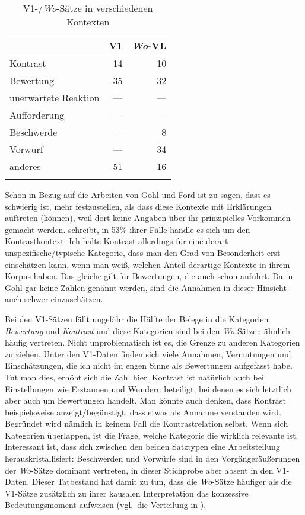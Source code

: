 \begin{table}
	\caption{\label{tab:1044}V1-/\textit{Wo}-Sätze in verschiedenen Kontexten}
    \begin{tabular}[t]{lrr}
    \lsptoprule
	& V1 & \textit{Wo}-VL\\\midrule
	Kontrast & 14 & 10\\
	Bewertung & 35 & 32\\
	unerwartete Reaktion & --- & ---\\
	Aufforderung & --- & ---\\
	Beschwerde & --- & 8\\
	Vorwurf & --- & 34\\
	anderes & 51 & 16\\
	\lspbottomrule	
    \end{tabular}   
\end{table}
Schon in Bezug auf die Arbeiten von Gohl und Ford ist zu sagen, dass es schwierig ist, mehr festzustellen, als dass diese Kontexte mit Erklärungen  auftreten (können), weil dort keine Angaben über ihr prinzipielles Vorkommen gemacht werden. \citet[548]{Ford1993} schreibt, in 53\% ihrer Fälle handle es sich um den Kontrastkontext. Ich halte Kontrast  allerdings für eine derart unspezifische/typische Kategorie, dass man den Grad von Besonderheit erst einschätzen kann, wenn man weiß, welchen Anteil derartige Kontexte in ihrem Korpus haben. Das glei\-che gilt für Bewertungen, die \citet{Ford1993} auch schon anführt. Da in Gohl gar keine Zahlen genannt werden, sind die Annahmen in dieser Hinsicht auch schwer einzuschätzen. 

Bei den V1-Sätzen fällt ungefähr die Hälfte der Belege in die Kategorien \textit{Be\-wertung} und \textit{Kontrast} und diese Kategorien sind bei den \textit{Wo}-Sätzen ähnlich häufig vertreten. Nicht unproblematisch ist es, die Grenze zu anderen Kategorien zu ziehen. Unter den V1-Daten finden sich viele Annahmen, Vermutungen und Einschätzungen, die ich nicht im engen Sinne als Bewertungen aufgefasst habe. Tut man dies, erhöht sich die Zahl hier. Kontrast ist natürlich auch bei Einstellungen wie Erstaunen und Wundern beteiligt, bei denen es sich letztlich aber auch um Bewertungen handelt. Man könnte auch denken, dass Kontrast bei\-spielsweise anzeigt/begünstigt, dass etwas als Annahme verstanden wird. Begründet wird nämlich in keinem Fall die Kontrastrelation selbst. Wenn sich Kategorien überlappen, ist die Frage, welche Kategorie die wirklich relevante ist. Interessant ist, dass sich zwischen den beiden Satztypen eine Arbeitsteilung he\-rauskristallisiert: Beschwerden und Vorwürfe sind in den Vorgängeräußerungen der \textit{Wo}-Sätze dominant vertreten, in dieser Stichprobe aber absent in den V1-Daten. Dieser Tatbestand hat damit zu tun, dass die \textit{Wo}-Sätze häufiger als die V1-Sätze zusätzlich zu ihrer kausalen Interpretation das konzessive Bedeutungsmoment aufweisen (vgl.\ die Verteilung in ).

